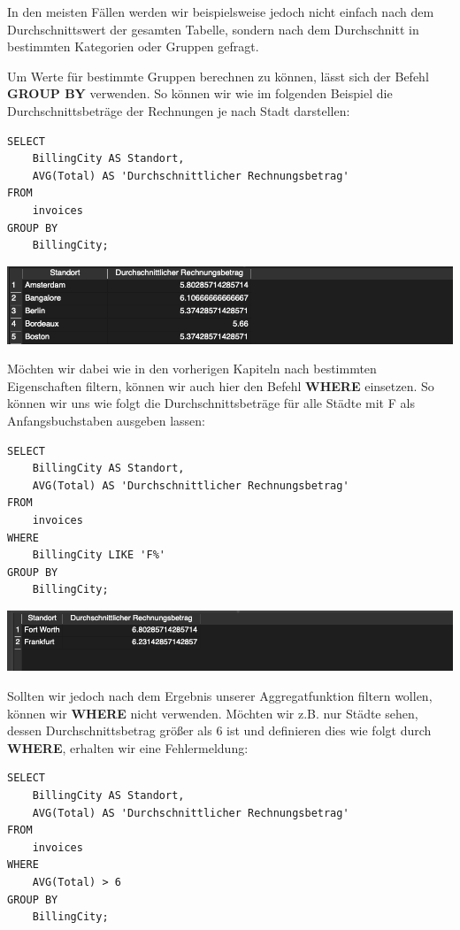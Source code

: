 \documentclass[
]{book}
\begin{document}
In den meisten Fällen werden wir beispielsweise jedoch nicht einfach nach dem Durchschnittswert der gesamten Tabelle, sondern nach dem Durchschnitt in bestimmten Kategorien oder Gruppen gefragt.

Um Werte für bestimmte Gruppen berechnen zu können, lässt sich der Befehl \textbf{GROUP BY} verwenden. So können wir wie im folgenden Beispiel die Durchschnittsbeträge der Rechnungen je nach Stadt darstellen:

\begin{verbatim}
SELECT
    BillingCity AS Standort,
    AVG(Total) AS 'Durchschnittlicher Rechnungsbetrag'
FROM
    invoices
GROUP BY
    BillingCity;
\end{verbatim}

\includegraphics[width=10.41667in,height=\textheight]{img-FUNC3.png}

Möchten wir dabei wie in den vorherigen Kapiteln nach bestimmten Eigenschaften filtern, können wir auch hier den Befehl \textbf{WHERE} einsetzen. So können wir uns wie folgt die Durchschnittsbeträge für alle Städte mit F als Anfangsbuchstaben ausgeben lassen:

\begin{verbatim}
SELECT
    BillingCity AS Standort,
    AVG(Total) AS 'Durchschnittlicher Rechnungsbetrag'
FROM
    invoices
WHERE
    BillingCity LIKE 'F%'
GROUP BY
    BillingCity;
\end{verbatim}

\includegraphics[width=10.41667in,height=\textheight]{img-FUNC4.png}

Sollten wir jedoch nach dem Ergebnis unserer Aggregatfunktion filtern wollen, können wir \textbf{WHERE} nicht verwenden. Möchten wir z.B. nur Städte sehen, dessen Durchschnittsbetrag größer als 6 ist und definieren dies wie folgt durch \textbf{WHERE}, erhalten wir eine Fehlermeldung:

\begin{verbatim}
SELECT
    BillingCity AS Standort,
    AVG(Total) AS 'Durchschnittlicher Rechnungsbetrag'
FROM
    invoices
WHERE
    AVG(Total) > 6
GROUP BY
    BillingCity;
\end{verbatim}
\end{document}
